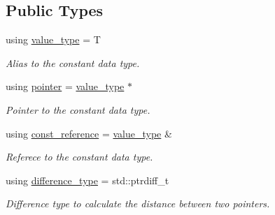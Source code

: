 \subsection*{Public Types}
\begin{DoxyCompactItemize}
\item 
\mbox{\label{classls_1_1my__const__iterator_aa7aa8489a065e4ddda33727d33c84b7d}} 
using \hyperlink{classls_1_1my__const__iterator_aa7aa8489a065e4ddda33727d33c84b7d}{value\+\_\+type} = T
\begin{DoxyCompactList}\small\item\em Alias to the constant data type. \end{DoxyCompactList}\item 
\mbox{\label{classls_1_1my__const__iterator_aef920ed4e39e8680046437ad8d898d78}} 
using \hyperlink{classls_1_1my__const__iterator_aef920ed4e39e8680046437ad8d898d78}{pointer} = \hyperlink{classls_1_1my__const__iterator_aa7aa8489a065e4ddda33727d33c84b7d}{value\+\_\+type} $\ast$
\begin{DoxyCompactList}\small\item\em Pointer to the constant data type. \end{DoxyCompactList}\item 
\mbox{\label{classls_1_1my__const__iterator_a47552bc9ef18669651047b1741c7ed42}} 
using \hyperlink{classls_1_1my__const__iterator_a47552bc9ef18669651047b1741c7ed42}{const\+\_\+reference} = \hyperlink{classls_1_1my__const__iterator_aa7aa8489a065e4ddda33727d33c84b7d}{value\+\_\+type} \&
\begin{DoxyCompactList}\small\item\em Referece to the constant data type. \end{DoxyCompactList}\item 
\mbox{\label{classls_1_1my__const__iterator_a1808102357aa1f98d3da0ebccbb9e767}} 
using \hyperlink{classls_1_1my__const__iterator_a1808102357aa1f98d3da0ebccbb9e767}{difference\+\_\+type} = std\+::ptrdiff\+\_\+t
\begin{DoxyCompactList}\small\item\em Difference type to calculate the distance between two pointers. \end{DoxyCompactList}\end{DoxyCompactItemize}
